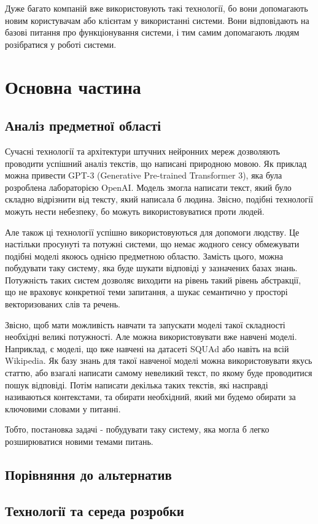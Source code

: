 \documentclass[a4paper,14pt]{extreport}
\newcommand\chap[1]{%
  \chapter*{#1}%
  \addcontentsline{toc}{chapter}{#1}}
\begin{document}
    Дуже багато компаній вже використовують такі технології, бо вони допомагають новим користувачам або клієнтам у використанні системи. Вони відповідають на базові питання про функціонування системи, і тим самим допомагають людям розібратися у роботі системи. 

\chap{Основна частина}
\section{Аналіз предметної області}
    Сучасні технології та архітектури штучних нейронних мереж дозволяють проводити успішний аналіз текстів, що написані природною мовою. Як приклад можна привести GPT-3 (Generative Pre-trained Transformer 3), яка була розроблена лабораторією OpenAI. Модель змогла написати текст, який було складно відрізнити від тексту, який написала б людина. Звісно, подібні технології можуть нести небезпеку, бо можуть використовуватися проти людей.

    Але також ці технології успішно використовуються для допомоги людству. Це настільки просунуті та потужні системи, що немає жодного сенсу обмежувати подібні моделі якоюсь однією предметною областю. Замість цього, можна побудувати таку систему, яка буде шукати відповіді у зазначених базах знань. Потужність таких систем дозволяє виходити на рівень такий рівень абстракції, що не враховує конкретної теми запитання, а шукає семантично у просторі векторизованих слів та речень.

    Звісно, щоб мати можливість навчати та запускати моделі такої складності необхідні великі потужності. Але можна використовувати вже навчені моделі. Наприклад, є моделі, що вже навчені на датасеті SQUAd або навіть на всій Wikipedia. Як базу знань для такої навченої моделі можна використовувати якусь статтю, або взагалі написати самому невеликий текст, по якому буде проводитися пошук відповіді. Потім написати декілька таких текстів, які насправді називаються контекстами, та обирати необхідний, який ми будемо обирати за ключовими словами у питанні.

    Тобто, постановка задачі - побудувати таку систему, яка могла б легко розширюватися новими темами питань.

\section{Порівняння до альтернатив}

\section{Технології та середа розробки}
\end{document}

